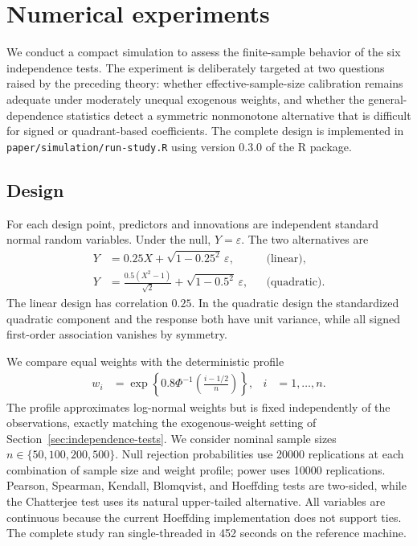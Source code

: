 \section{Numerical experiments}
\label{sec:numerical-experiments}

We conduct a compact simulation to assess the finite-sample behavior of the
six independence tests.  The experiment is deliberately targeted at two
questions raised by the preceding theory: whether effective-sample-size
calibration remains adequate under moderately unequal exogenous weights, and
whether the general-dependence statistics detect a symmetric nonmonotone
alternative that is difficult for signed or quadrant-based coefficients.  The
complete design is implemented in
\texttt{paper/simulation/run-study.R} using version 0.3.0 of the R package.

\subsection{Design}

For each design point, predictors and innovations are independent standard
normal random variables.  Under the null, $Y=\varepsilon$.  The two
alternatives are
\begin{align*}
  Y &= 0.25X + \sqrt{1-0.25^2}\,\varepsilon,
      &&\text{(linear)}, \\
  Y &= \frac{0.5(X^2-1)}{\sqrt{2}}
       + \sqrt{1-0.5^2}\,\varepsilon,
      &&\text{(quadratic)}.
\end{align*}
The linear design has correlation $0.25$.  In the quadratic design the
standardized quadratic component and the response both have unit variance,
while all signed first-order association vanishes by symmetry.

We compare equal weights with the deterministic profile
\begin{align*}
  w_i
  &= \exp\left\{0.8\Phi^{-1}
       \left(\frac{i-1/2}{n}\right)\right\},
  & i&=1,\ldots,n.
\end{align*}
The profile approximates log-normal weights but is fixed independently of the
observations, exactly matching the exogenous-weight setting of
Section~\ref{sec:independence-tests}.  We consider nominal sample sizes
$n\in\{50,100,200,500\}$.  Null rejection probabilities use 20000 replications
at each combination of sample size and weight profile; power uses 10000
replications.  Pearson, Spearman, Kendall, Blomqvist, and Hoeffding tests are
two-sided, while the Chatterjee test uses its natural upper-tailed alternative.
All variables are continuous because the current Hoeffding implementation does
not support ties.  The complete study ran single-threaded in 452 seconds on
the reference machine.

